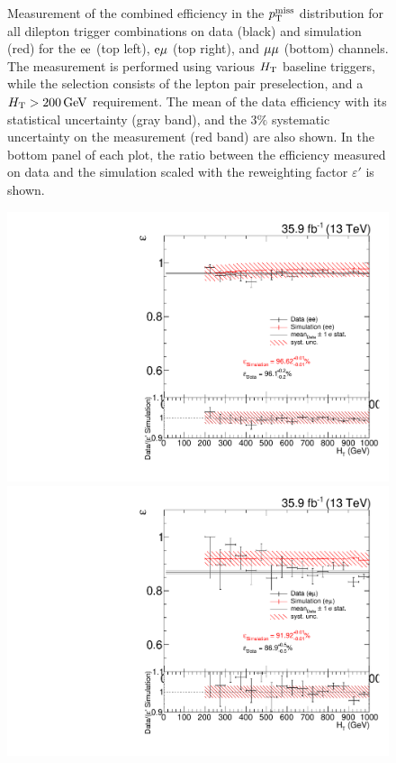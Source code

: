 \begin{figure}[htb]
 \caption{Measurement of the combined efficiency in the $p_{\mathrm{T}}^\text{miss}$ distribution for all dilepton trigger combinations on data (black) and simulation (red) for the $\mathrm{e}\mathrm{e}$ (top left), $\mathrm{e}\mu$ (top right), and $\mu\mu$ (bottom) channels. The measurement is performed using various $H_{\mathrm{T}}$ baseline triggers, while the selection consists of the lepton pair preselection, and a $H_{\mathrm{T}}>200\,\text{Ge\hspace{-.08em}V}$ requirement. The mean of the data efficiency with its statistical uncertainty (gray band), and the $3\%$ systematic uncertainty on the measurement (red band) are also shown. In the bottom panel of each plot, the ratio between the efficiency measured on data and the simulation scaled with the reweighting factor $\varepsilon'$ is shown.}
 \label{fig:app_triggEff2}
\end{figure}

\begin{figure}[htb]
 \centering
 \includegraphics[width=\pairwidth]{figures/triggerStudies/efficiency_dataHT_trigDilep_ptcuts_EE_ht}
 \includegraphics[width=\pairwidth]{figures/triggerStudies/efficiency_dataHT_trigDilep_ptcuts_EM_ht}

\end{figure}
